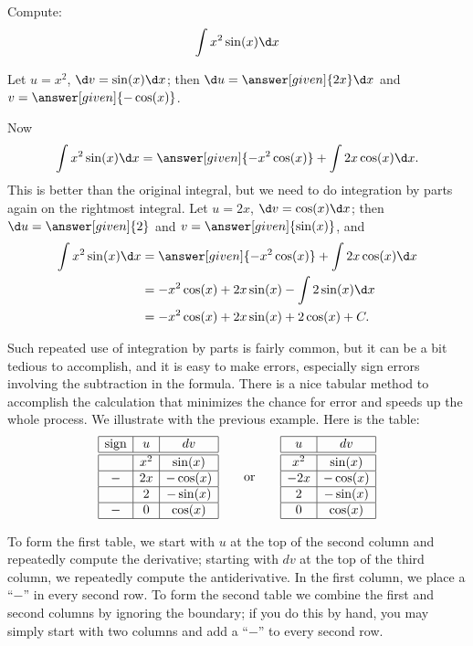 \documentclass{ximera}
\begin{document}
\begin{example}
Compute:
\[
\int x^2\sin(x)\d x
\] 
\begin{explanation}
Let $u=x^2$, $\d v=\sin(x)\d x$; then $\d u=\answer[given]{2x}\d x$ and $v=\answer[given]{-\cos(x)}$. 

Now 
\[
\int x^2\sin(x)\d x=\answer[given]{-x^2\cos(x)}+\int 2x\cos(x)\d x.
\] 
This is better than the original integral, but we need to do
integration by parts again on the rightmost integral. Let $u=2x$, $\d v=\cos(x)\d x$; then $\d u=\answer[given]{2}$
and $v=\answer[given]{\sin(x)}$, and
\begin{align*}
  \int x^2\sin(x)\d x &=\answer[given]{-x^2\cos(x)}+\int 2x\cos(x)\d x \\
  &=-x^2\cos(x)+ 2x\sin(x) - \int 2\sin(x)\d x \\
  &=-x^2\cos(x)+ 2x\sin(x) + 2\cos(x) + C. 
\end{align*}
\end{explanation}
\end{example}





Such repeated use of integration by parts is fairly common, but it can
be a bit tedious to accomplish, and it is easy to make
errors, especially sign errors involving the subtraction in the
formula. There is a nice tabular method to accomplish the calculation
that minimizes the chance for error and speeds up the whole
process. We illustrate with the previous example. Here is the
table:
\[
\begin{array}{|c|c|c|}\hline
\text{sign} & u & dv \\ \hline \hline
 & x^2 & \sin(x) \\ \hline
- & 2x & -\cos(x) \\ \hline
  & 2  & -\sin(x) \\ \hline
- & 0  & \cos(x) \\ \hline
\end{array}
\qquad\text{or}\qquad
\begin{array}{|c|c|}\hline
u & dv \\ \hline\hline
x^2 & \sin(x) \\ \hline 
-2x & -\cos(x) \\\hline
2 & -\sin(x)\\\hline
0 & \cos(x)\\\hline
\end{array}
\]

To form the first table, we start with $u$ at the top of the second
column and repeatedly compute the derivative; starting with $dv$ at
the top of the third column, we repeatedly compute the
antiderivative. In the first column, we place a ``$-$'' in every
second row. To form the second table we combine the first and second
columns by ignoring the boundary; if you do this by hand, you may
simply start with two columns and add a ``$-$'' to every second row.
\end{document}
